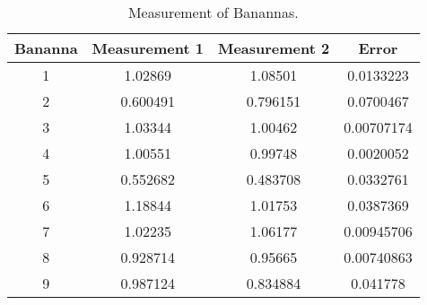 \begin{table}
\begin{minipage}{\textwidth}
\begin{center}
\caption[Bananna Measurements]{\label{tab:bananna}Measurement of Banannas.}
\begin{tabular}{cccc} %
\hline \hline
Bananna & Measurement 1 &  Measurement 2 & Error \\
\hline
1 & 1.02869 & 1.08501 & 0.0133223 \\
2 & 0.600491 & 0.796151 & 0.0700467 \\
3 & 1.03344 & 1.00462 & 0.00707174 \\
4 & 1.00551 & 0.99748 & 0.0020052 \\
5 & 0.552682 & 0.483708 & 0.0332761 \\
6 & 1.18844 & 1.01753 & 0.0387369  \\
7 & 1.02235 & 1.06177 & 0.00945706  \\
8 & 0.928714 & 0.95665 & 0.00740863  \\
9 & 0.987124 & 0.834884 & 0.041778  \\
\hline \hline
\end{tabular}
\end{center}
\end{minipage}
\end{table}